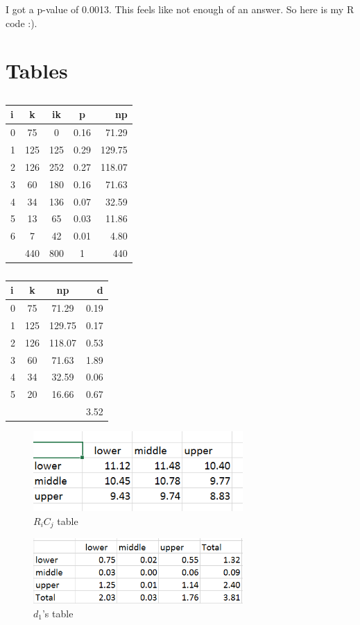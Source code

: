 \documentclass[12pt]{article}
\newenvironment{problem}[2][Problem]{\begin{trivlist}
\item[\hskip \labelsep {\bfseries #1}\hskip \labelsep {\bfseries #2.}]}{\end{trivlist}}
\begin{document}
\begin{problem}{Randomization Test} I got a p-value of 0.0013. This feels like not enough of an answer. So here is my R code :). 

\end{problem}
\newpage
\section{Tables}
\begin{table}[h!]
\centering
\begin{tabular}{ l | c | c | c | r }		
i  &	k	&		ik 	&	p 	 &		np    \\
\hline
0 &	75	&		0	&	0.16 &	71.29  \\  
1 &	125	&		125	&	0.29 &	129.75   \\
2 &	126	&		252	&	0.27 &	118.07  \\
3 &	60	&		180	&	0.16 &	71.63     \\
4 & 	34	&		136	&	0.07 &	32.59  \\
5 &	13	&		65	&	0.03 &	11.86  \\
6 &	7	&		42	&	0.01 &	4.80  \\
\hline
  &	440 &		800	&	1	 &	440      \\
\end{tabular}
\caption{}
\end{table}

\begin{table}[h!]
\centering
\begin{tabular}{ l | c | c | r }		
i&		k	&np	& d \\
\hline
0&		75	&71.29	&0.19 \\
1&		125	&129.75	&0.17 \\
2&		126	&118.07	&0.53 \\
3&		60	&71.63	&1.89 \\
4&		34	&32.59	&0.06 \\ 
5&	20	&16.66	&0.67 \\
\hline
	&		& 		&3.52 \\
\end{tabular}
\caption{}
\end{table}

\begin{figure}[h!]
\centering
  \includegraphics[width=8cm]{10-5-6-a.png}
  \caption{$R_iC_j$ table}
  \label{fig:boat1}
\end{figure}


\begin{figure}[h!]
\centering
  \includegraphics[width=8cm]{10-5-6-b.png}
  \caption{$d_1$'s table}
  \label{fig:boat1}
\end{figure}
\end{document}
